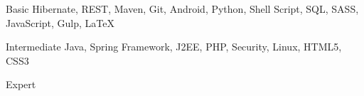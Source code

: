

\begin{cvskills}

  \cvskill
    {Basic} %
    {Hibernate, REST, Maven, Git, Android, Python, Shell Script, SQL, SASS, JavaScript, Gulp, LaTeX} %

  \cvskill
    {Intermediate} %
    {Java, Spring Framework, J2EE, PHP, Security, Linux, HTML5, CSS3} %

  \cvskill
    {Expert} %
    {} %

\end{cvskills}
